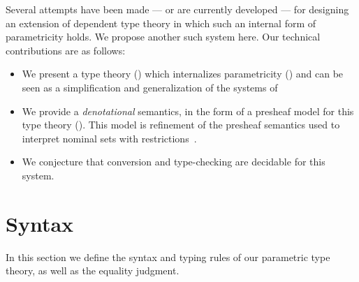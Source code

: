 \documentclass[english]{PaperTools/latex/lipics}
\begin{document}
Several attempts have been made
\citep{bernardy_computational_2012,bernardy_type-theory_2013} --- or are currently
developed \citep{altenkirch2014syntax} ---
for designing an extension of dependent type theory in which such an internal form of
parametricity holds. We propose another such system here.
Our technical contributions are as follows:
\begin{itemize}
\item We present a type theory () which internalizes parametricity ()
  and can be seen as a simplification and generalization of the systems of
  \cite{bernardy_computational_2012,bernardy_type-theory_2013}
\item We provide a \emph{denotational} semantics, in the form of a presheaf model for this type theory ().
      This model is refinement of the presheaf semantics used to
      interpret nominal sets with
      restrictions~\citep{bezem2014model,DBLP:journals/corr/Pitts14}.
\item We conjecture that conversion and type-checking are decidable for this system.
\end{itemize}

\section{Syntax}
\label{sec:syntax}
In this section we define the syntax and typing rules of our
parametric type theory, as well as the equality judgment.
\end{document}
